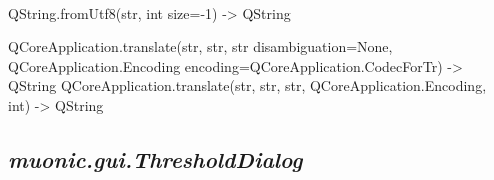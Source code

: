 \documentclass[letterpaper,10pt,english]{sphinxmanual}
\begin{document}
\begin{fulllineitems}
\label{muonic:muonic.gui.ConfigDialog.ConfigDialog}~

\begin{fulllineitems}
\label{muonic:muonic.gui.ConfigDialog.ConfigDialog.retranslateUi}
\end{fulllineitems}


\end{fulllineitems}


\begin{fulllineitems}
\label{muonic:muonic.gui.ConfigDialog._fromUtf8}
QString.fromUtf8(str, int size=-1) -\textgreater{} QString

\end{fulllineitems}


\begin{fulllineitems}
\label{muonic:muonic.gui.ConfigDialog.tr}
QCoreApplication.translate(str, str, str disambiguation=None, QCoreApplication.Encoding encoding=QCoreApplication.CodecForTr) -\textgreater{} QString
QCoreApplication.translate(str, str, str, QCoreApplication.Encoding, int) -\textgreater{} QString

\end{fulllineitems}



\subsection{\emph{muonic.gui.ThresholdDialog}}
\label{muonic:module-muonic.gui.ThresholdDialog}\label{muonic:muonic-gui-thresholddialog}

\begin{fulllineitems}
\label{muonic:muonic.gui.ThresholdDialog.ThresholdDialog}
\end{fulllineitems}
\end{document}
